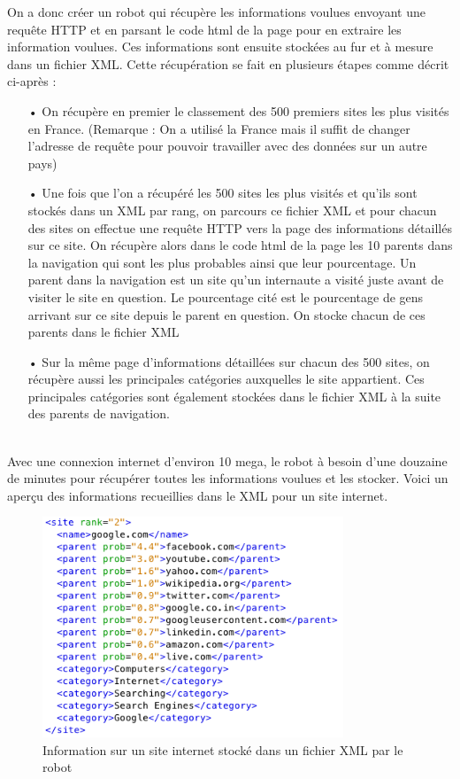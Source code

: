 \documentclass[a4paper, 11pt]{article}
\begin{document}
On a donc créer un robot qui récupère les informations voulues envoyant une requête HTTP et en parsant le code html de la page pour en extraire les information voulues. Ces informations sont ensuite stockées au fur et à mesure dans un fichier XML. Cette récupération se fait en plusieurs étapes comme décrit ci-après : \\
\begin{itemize}
\item[•] On récupère en premier le classement des 500 premiers sites les plus visités en France. (Remarque : On a utilisé la France mais il suffit de changer l'adresse de requête pour pouvoir travailler avec des données sur un autre pays)
\item[•] Une fois que l'on a récupéré les 500 sites les plus visités et qu'ils sont stockés dans un XML par rang, on parcours ce fichier XML et pour chacun des sites on effectue une requête HTTP vers la page des informations détaillés sur ce site. On récupère alors dans le code html de la page les 10 parents dans la navigation qui sont les plus probables ainsi que leur pourcentage. Un parent dans la navigation est un site qu'un internaute a visité juste avant de visiter le site en question. Le pourcentage cité est le pourcentage de gens arrivant sur ce site depuis le parent en question. On stocke chacun de ces parents dans le fichier XML
\item[•] Sur la même page d'informations détaillées sur chacun des 500 sites, on récupère aussi les principales catégories auxquelles le site appartient. Ces principales catégories sont également stockées dans le fichier XML à la suite des parents de navigation.
\end{itemize}~\\

Avec une connexion internet d'environ 10 mega, le robot à besoin d'une douzaine de minutes pour récupérer toutes les informations voulues et les stocker. Voici un aperçu des informations recueillies dans le XML pour un site internet.

\begin{figure}[h!]
\center
\includegraphics[width=9cm]{images/infoSiteXML.png}
\caption{Information sur un site internet stocké dans un fichier XML par le robot}
\end{figure}
\end{document}
